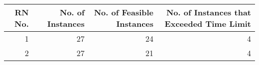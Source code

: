 \begin{tabular}{rrrr}
\toprule
 RN No. &  No. of Instances &  No. of Feasible Instances &  No. of Instances that Exceeded Time Limit \\
\midrule
      1 &                27 &                         24 &                                          4 \\
      2 &                27 &                         21 &                                          4 \\
\bottomrule
\end{tabular}

